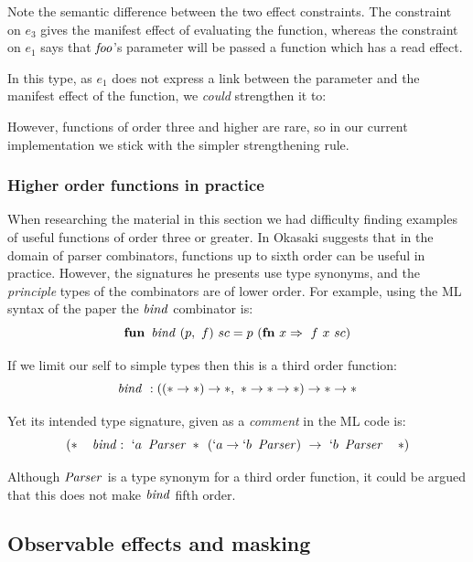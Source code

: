 Note the semantic difference between the two effect constraints. The constraint on $e_3$ gives the manifest effect of evaluating the function, whereas the constraint on $e_1$ says that $\operatorname{\mathit{foo}}$'s parameter will be passed a function which has a read effect. 

In this type, as $e_1$ does not express a link between the parameter and the manifest effect of the function, we \emph{could} strengthen it to:


However, functions of order three and higher are rare, so in our current implementation we stick with the simpler strengthening rule.


\bigskip
\subsubsection{Higher order functions in practice}

When researching the material in this section we had difficulty finding examples of useful functions of order three or greater. In \cite{okasaki:even-higher-order-functions-for-parsing} Okasaki suggests that in the domain of parser combinators, functions up to sixth order can be useful in practice. However, the signatures he presents use type synonyms, and the \emph{principle} types of the combinators are of lower order. For example, using the ML syntax of the paper the $\operatorname{\mathit{bind}}$ combinator is:
$$	\textrm{\textbf{fun}} \ \operatorname{\mathit{bind}} \ (p, \ f) \ sc = p \ (\textrm{\textbf{fn}} \ x \Rightarrow \ f \ x \ sc)
$$

If we limit our self to simple types then this is a third order function:
$$	\operatorname{\mathit{bind}} \ : ( (* \to *) \to *, \ * \to * \to *) \to * \to *
$$

Yet its intended type signature, given as a \emph{comment} in the ML code is:
$$ (* \quad \ibind : \ `a \ \iParser \ * \ \ (`a \to `b \ \iParser) \ \to \ `b \ \iParser \quad *)
$$

Although $\operatorname{\mathit{Parser}}$ is a type synonym for a third order function, it could be argued that this does not make $\operatorname{\mathit{bind}}$ fifth order. 


\subsection{Observable effects and masking}
\label{System:Effects:masking}

